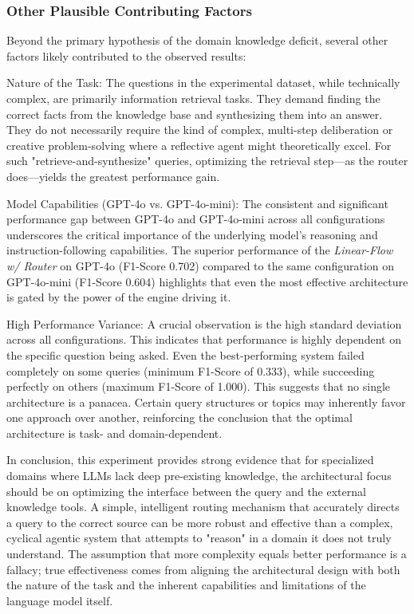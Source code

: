         \subsubsection{Other Plausible Contributing Factors}
        
            Beyond the primary hypothesis of the domain knowledge deficit, several other factors likely contributed to the observed results:
            
            Nature of the Task: The questions in the experimental dataset, while technically complex, are primarily information retrieval tasks. They demand finding the correct facts from the knowledge base and synthesizing them into an answer. They do not necessarily require the kind of complex, multi-step deliberation or creative problem-solving where a reflective agent might theoretically excel. For such "retrieve-and-synthesize" queries, optimizing the retrieval step—as the router does—yields the greatest performance gain.
            
            Model Capabilities (GPT-4o vs. GPT-4o-mini): The consistent and significant performance gap between GPT-4o and GPT-4o-mini across all configurations underscores the critical importance of the underlying model's reasoning and instruction-following capabilities. The superior performance of the \textit{Linear-Flow w/ Router} on GPT-4o (F1-Score 0.702) compared to the same configuration on GPT-4o-mini (F1-Score 0.604) highlights that even the most effective architecture is gated by the power of the engine driving it.
            
            High Performance Variance: A crucial observation is the high standard deviation across all configurations. This indicates that performance is highly dependent on the specific question being asked. Even the best-performing system failed completely on some queries (minimum F1-Score of 0.333), while succeeding perfectly on others (maximum F1-Score of 1.000). This suggests that no single architecture is a panacea. Certain query structures or topics may inherently favor one approach over another, reinforcing the conclusion that the optimal architecture is task- and domain-dependent.
            
            In conclusion, this experiment provides strong evidence that for specialized domains where LLMs lack deep pre-existing knowledge, the architectural focus should be on optimizing the interface between the query and the external knowledge tools. A simple, intelligent routing mechanism that accurately directs a query to the correct source can be more robust and effective than a complex, cyclical agentic system that attempts to "reason" in a domain it does not truly understand. The assumption that more complexity equals better performance is a fallacy; true effectiveness comes from aligning the architectural design with both the nature of the task and the inherent capabilities and limitations of the language model itself.